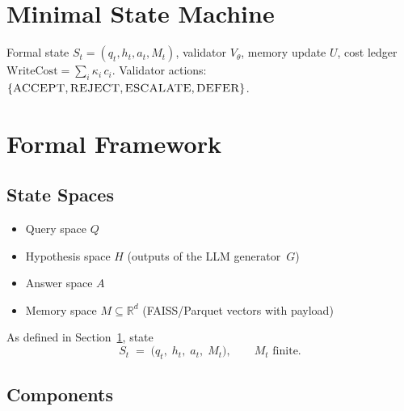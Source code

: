 \documentclass[11pt]{article}
\newcommand{\WriteCost}{\mathrm{WriteCost}}
\begin{document}
\section{Minimal State Machine}
\label{sec:minimal-state-machine}
Formal state $S_t=(q_t,h_t,a_t,M_t)$, validator $V_\theta$, memory update
$U$, cost ledger $\WriteCost = \sum_i \kappa_i\,c_i$.
%
Validator actions:
$\{\textsc{ACCEPT},\textsc{REJECT},\textsc{ESCALATE},\textsc{DEFER}\}$.
\section{Formal Framework}
\label{sec:framework}

\subsection{State Spaces}
\label{sec:state-spaces}

\begin{itemize}\setlength\itemsep{2pt}
  \item Query space $Q$
  \item Hypothesis space $H$ (outputs of the LLM generator~$G$)
  \item Answer space $A$
  \item Memory space $M\subseteq\mathbb R^{d}$ (FAISS/Parquet vectors with payload)
\end{itemize}

As defined in Section~\ref{sec:minimal-state-machine}, state
\[
  S_t \;=\; \bigl(q_t,\; h_t,\; a_t,\; M_t \bigr), \qquad M_t\text{ finite}.
\]

\subsection{Components}
\label{sec:components}
\end{document}
